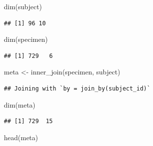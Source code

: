 \documentclass[
]{article}
\newenvironment{Shaded}{\begin{snugshade}}{\end{snugshade}}
\newcommand{\FunctionTok}[1]{\textcolor[rgb]{0.00,0.00,0.00}{#1}}
\newcommand{\NormalTok}[1]{#1}
\newcommand{\OtherTok}[1]{\textcolor[rgb]{0.56,0.35,0.01}{#1}}
\begin{document}
\begin{Shaded}
\begin{Highlighting}[]
\FunctionTok{dim}\NormalTok{(subject)}
\end{Highlighting}
\end{Shaded}

\begin{verbatim}
## [1] 96 10
\end{verbatim}

\begin{Shaded}
\begin{Highlighting}[]
\FunctionTok{dim}\NormalTok{(specimen)}
\end{Highlighting}
\end{Shaded}

\begin{verbatim}
## [1] 729   6
\end{verbatim}

\begin{Shaded}
\begin{Highlighting}[]
\NormalTok{meta }\OtherTok{\textless{}{-}} \FunctionTok{inner\_join}\NormalTok{(specimen, subject)}
\end{Highlighting}
\end{Shaded}

\begin{verbatim}
## Joining with `by = join_by(subject_id)`
\end{verbatim}

\begin{Shaded}
\begin{Highlighting}[]
\FunctionTok{dim}\NormalTok{(meta)}
\end{Highlighting}
\end{Shaded}

\begin{verbatim}
## [1] 729  15
\end{verbatim}

\begin{Shaded}
\begin{Highlighting}[]
\FunctionTok{head}\NormalTok{(meta)}
\end{Highlighting}
\end{Shaded}
\end{document}
